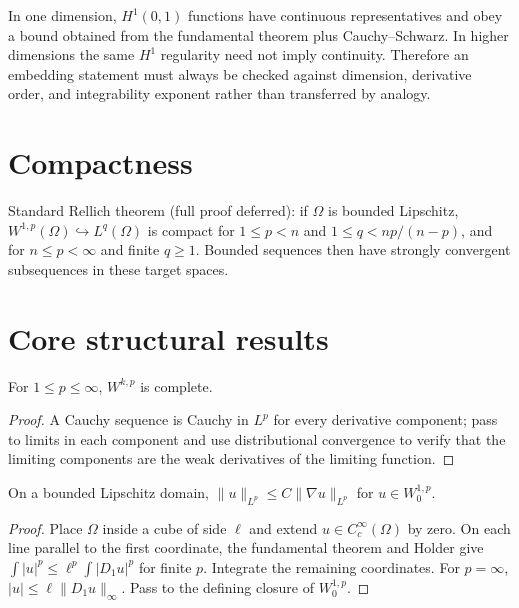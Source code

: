 \begin{example}\label{ex:iii21-expand-03}
In one dimension, \(H^1(0,1)\) functions have continuous representatives and
obey a bound obtained from the fundamental theorem plus Cauchy--Schwarz. In
higher dimensions the same \(H^1\) regularity need not imply continuity.
Therefore an embedding statement must always be checked against dimension,
derivative order, and integrability exponent rather than transferred by
analogy.
\end{example}
\section{Compactness}
Standard Rellich theorem (full proof deferred): if $\Omega$ is bounded Lipschitz, $W^{1,p}(\Omega)\hookrightarrow L^q(\Omega)$ is compact for $1\le p<n$ and $1\le q<np/(n-p)$, and for $n\le p<\infty$ and finite $q\ge1$. Bounded sequences then have strongly convergent subsequences in these target spaces.

\section{Core structural results}

\begin{theorem}[Completeness of $W^{k,p}$]\label{thm:iii21-01}
For $1\le p\le\infty$, $W^{k,p}$ is complete.
\begin{proof}
A Cauchy sequence is Cauchy in $L^p$ for every derivative component; pass to limits in each component and use distributional convergence to verify that the limiting components are the weak derivatives of the limiting function.
\end{proof}
\end{theorem}

\begin{theorem}\label{thm:iii21-02}
On a bounded Lipschitz domain, $\|u\|_{L^p}\le C\|\nabla u\|_{L^p}$ for $u\in W_0^{1,p}$.
\begin{proof}
Place $\Omega$ inside a cube of side $\ell$ and extend $u\in C_c^\infty(\Omega)$ by zero. On each line parallel to the first coordinate, the fundamental theorem and Holder give $\int|u|^p\le\ell^p\int|D_1u|^p$ for finite $p$. Integrate the remaining coordinates. For $p=\infty$, $|u|\le\ell\|D_1u\|_\infty$. Pass to the defining closure of $W_0^{1,p}$.
\end{proof}
\end{theorem}

